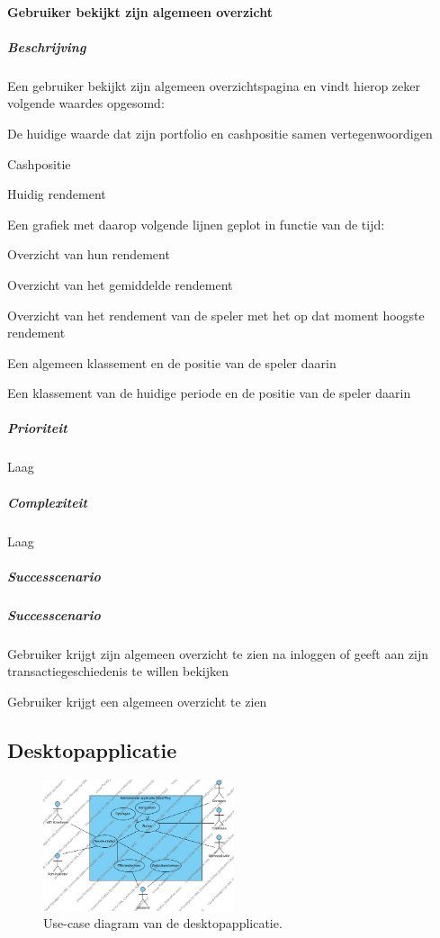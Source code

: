 \paragraph{Gebruiker bekijkt zijn algemeen overzicht}
\begin{compact}
\subparagraph{Beschrijving} Een gebruiker bekijkt zijn algemeen overzichtspagina en vindt hierop zeker volgende waardes opgesomd:
\begin{itemize_compact}
	\item De huidige waarde dat zijn portfolio en cashpositie samen vertegenwoordigen
	\item Cashpositie
	\item Huidig rendement
	\item Een grafiek met daarop volgende lijnen geplot in functie van de tijd:
  \begin{itemize_compact}
  	\item  Overzicht van hun rendement
    \item Overzicht van het gemiddelde rendement
    \item Overzicht van het rendement van de speler met het op dat moment hoogste rendement
  \end{itemize_compact}
  \item Een algemeen klassement en de positie van de speler daarin
  \item Een klassement van de huidige periode en de positie van de speler daarin
\end{itemize_compact}
\subparagraph{Prioriteit}Laag
\subparagraph{Complexiteit}Laag
\subparagraph{Successcenario}
\subparagraph{Successcenario}
\begin{enumerate_compact}
 \item Gebruiker krijgt zijn algemeen overzicht te zien na inloggen of geeft aan zijn transactiegeschiedenis te willen bekijken
 \item Gebruiker krijgt een algemeen overzicht te zien
\end{enumerate_compact}
\end{compact}


\subsection{Desktopapplicatie}

\begin{figure}[h!]
	\centering
		\includegraphics[width=0.5\textwidth]{images/analyse/ucd_desktop}
	\caption{Use-case diagram van de desktopapplicatie.}
\end{figure}

